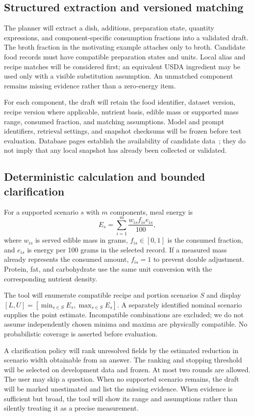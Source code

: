 \documentclass[11pt,a4paper]{article}
\begin{document}
\subsection{Structured extraction and versioned matching}
The planner will extract a dish, additions, preparation state, quantity expressions, and component-specific consumption fractions into a validated draft. The broth fraction in the motivating example attaches only to broth. Candidate food records must have compatible preparation states and units. Local alias and recipe matches will be considered first; an equivalent USDA ingredient may be used only with a visible substitution assumption. An unmatched component remains missing evidence rather than a zero-energy item.

For each component, the draft will retain the food identifier, dataset version, recipe version where applicable, nutrient basis, edible mass or supported mass range, consumed fraction, and matching assumptions. Model and prompt identifiers, retrieval settings, and snapshot checksums will be frozen before test evaluation. Database pages establish the availability of candidate data~\cite{tfda,usda}; they do not imply that any local snapshot has already been collected or validated.

\subsection{Deterministic calculation and bounded clarification}
For a supported scenario $s$ with $m$ components, meal energy is
\begin{equation}
 E_s=\sum_{i=1}^{m}\frac{w_{is} f_{is} e_{is}}{100},
\end{equation}
where $w_{is}$ is served edible mass in grams, $f_{is}\in[0,1]$ is the consumed fraction, and $e_{is}$ is energy per 100 grams in the selected record. If a measured mass already represents the consumed amount, $f_{is}=1$ to prevent double adjustment. Protein, fat, and carbohydrate use the same unit conversion with the corresponding nutrient density.

The tool will enumerate compatible recipe and portion scenarios $S$ and display $[L,U]=[\min_{s\in S}E_s,\max_{s\in S}E_s]$. A separately identified nominal scenario supplies the point estimate. Incompatible combinations are excluded; we do not assume independently chosen minima and maxima are physically compatible. No probabilistic coverage is asserted before evaluation.

A clarification policy will rank unresolved fields by the estimated reduction in scenario width obtainable from an answer. The ranking and stopping threshold will be selected on development data and frozen. At most two rounds are allowed. The user may skip a question. When no supported scenario remains, the draft will be marked unestimated and list the missing evidence. When evidence is sufficient but broad, the tool will show its range and assumptions rather than silently treating it as a precise measurement.
\end{document}
